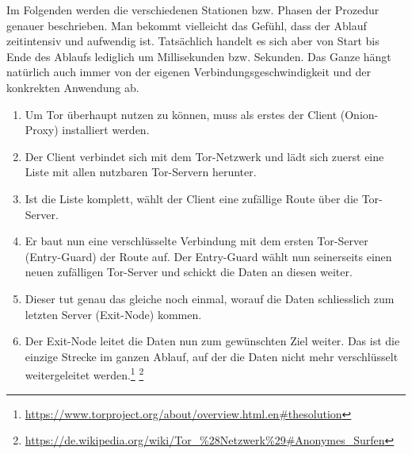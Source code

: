 Im Folgenden werden die verschiedenen Stationen bzw. Phasen der Prozedur genauer beschrieben. Man bekommt vielleicht das Gefühl, dass der Ablauf zeitintensiv und aufwendig ist. Tatsächlich handelt es sich aber von Start bis Ende des Ablaufs lediglich um Millisekunden bzw. Sekunden. Das Ganze hängt natürlich auch immer von der eigenen Verbindungsgeschwindigkeit und der konkrekten Anwendung ab.

\begin{enumerate}
\item Um Tor überhaupt nutzen zu können, muss als erstes der  Client (Onion-Proxy) installiert werden.
\item Der Client verbindet sich mit dem Tor-Netzwerk und lädt sich zuerst eine Liste mit allen nutzbaren Tor-Servern herunter.
\item Ist die Liste komplett, wählt der Client eine zufällige Route über die Tor-Server.
\item Er baut nun eine verschlüsselte Verbindung mit dem ersten Tor-Server (Entry-Guard) der Route auf. Der Entry-Guard wählt nun seinerseits einen neuen zufälligen Tor-Server und schickt die Daten an diesen weiter.
\item Dieser tut genau das gleiche noch einmal, worauf die Daten schliesslich zum letzten Server (Exit-Node) kommen.
\item Der Exit-Node leitet die Daten nun zum gewünschten Ziel weiter. Das ist die einzige Strecke im ganzen Ablauf, auf der die Daten nicht mehr verschlüsselt weitergeleitet werden.\footnote{\url{https://www.torproject.org/about/overview.html.en\#thesolution}}
\footnote{\url{https://de.wikipedia.org/wiki/Tor_\%28Netzwerk\%29\#Anonymes_Surfen}}
\end{enumerate}

